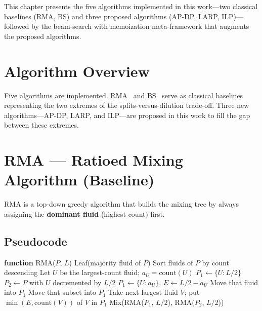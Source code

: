 
This chapter presents the five algorithms implemented in this work---two classical baselines (RMA, BS) and three proposed algorithms (AP-DP, LARP, ILP)---followed by the beam-search with memoization meta-framework that augments the proposed algorithms.

\section{Algorithm Overview}

Five algorithms are implemented. RMA~\cite{roy2010layout} and BS~\cite{thies_bs} serve as classical baselines representing the two extremes of the splits-versus-dilution trade-off. Three new algorithms---AP-DP, LARP, and ILP---are proposed in this work to fill the gap between these extremes.

\section{RMA --- Ratioed Mixing Algorithm (Baseline)}
\label{sec:rma_algo}

RMA is a top-down greedy algorithm that builds the mixing tree by always assigning the \textbf{dominant fluid} (highest count) first.

\subsection{Pseudocode}

\begin{algorithmic}[1]
\STATE \textbf{function} RMA($P$, $L$)
    \RETURN Leaf(majority fluid of $P$)
\ENDIF
\STATE Sort fluids of $P$ by count descending
\STATE Let $U$ be the largest-count fluid; $a_U = \text{count}(U)$
    \STATE $P_1 \gets \{U: L/2\}$
    \STATE $P_2 \gets P$ with $U$ decremented by $L/2$
\ELSE
    \STATE $P_1 \gets \{U: a_U\}$, \quad $E \gets L/2 - a_U$
        \STATE Move that fluid into $P_1$
        \STATE Move that subset into $P_1$
    \ELSE
        \STATE Take next-largest fluid $V$; put $\min(E, \text{count}(V))$ of $V$ in $P_1$
    \ENDIF
\ENDIF
\RETURN Mix(RMA($P_1$, $L/2$), RMA($P_2$, $L/2$))
\end{algorithmic}

